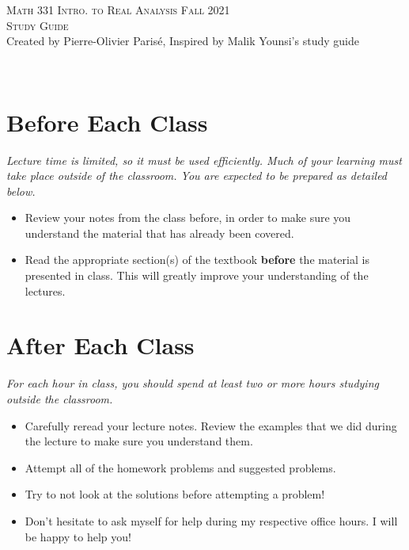 \documentclass[12pt]{amsart}
\begin{document}
\thispagestyle{empty}

\noindent\hrulefill
\begin{center}
\Large{\textsc{Math 331 Intro. to Real Analysis} }\quad \Large{\textsc{Fall 2021}} \\
\textsc{Study Guide}\\
\small{Created by Pierre-Olivier Paris{\'e}, Inspired by Malik Younsi's study guide}
\end{center}
\hrulefill \\

\section*{Before Each Class}
\textit{Lecture time is limited, so it must be used efficiently. Much of your learning must take place outside of the classroom. You are expected to be prepared as detailed below.}
	\begin{itemize}
	\item Review your notes from the class before, in order to make sure you understand the material that has already been covered.
	\item Read the appropriate section(s) of the textbook \textbf{before} the material is presented in class. This will greatly improve your understanding of the lectures.
	\end{itemize}
	
\section*{After Each Class}
\textit{For each hour in class, you should spend at least two or more hours studying outside the classroom.}
	\begin{itemize}
	\item Carefully reread your lecture notes. Review the examples that we did during the lecture to make sure you understand them.
	\item Attempt all of the homework problems and suggested problems.
	\item Try to not look at the solutions before attempting a problem!
	\item Don't hesitate to ask myself for help during my respective office hours. I will be happy to help you!
	\end{itemize}
	
\end{document}
